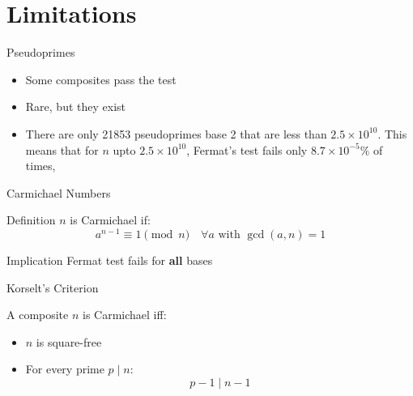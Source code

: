 \documentclass{beamer}
\newcommand{\bld}[1]{\textbf{#1}}
\begin{document}
\section{Limitations}

\begin{frame}{Pseudoprimes}

\begin{itemize}
    \item Some composites pass the test
    \item Rare, but they exist
    \item There are only 21853 pseudoprimes base 2 that are less than $2.5\times10^{10}$. This means that for $n$ upto $2.5\times10^{10}$, Fermat's test fails only $8.7\times{10^{-5}}\%$ of times, 
\end{itemize}

\end{frame}


\begin{frame}{Carmichael Numbers}

\begin{block}{Definition}
$n$ is Carmichael if:
\[
a^{n-1} \equiv 1 \pmod{n}
\quad \forall a \text{ with } \gcd(a,n)=1
\]
\end{block}

\vspace{1em}

\begin{block}{Implication}
Fermat test fails for \bld{all} bases
\end{block}

\end{frame}


\begin{frame}{Korselt's Criterion}

A composite $n$ is Carmichael iff:

\begin{itemize}
    \item $n$ is square-free
    \item For every prime $p \mid n$:
    \[
    p-1 \mid n-1
    \]
\end{itemize}

\end{frame}

\end{document}
